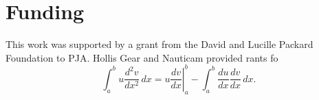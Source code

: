 \section{Funding}
\label{funding} 
This work was supported by a grant from the David and Lucille Packard Foundation to PJA. Hollis Gear and Nauticam provided rants fo
\begin{equation}
\label{eqn:drag}
	\int_a^bu\frac{d^2v}{dx^2}\,dx
	=\left.u\frac{dv}{dx}\right|_a^b
	-\int_a^b\frac{du}{dx}\frac{dv}{dx}\,dx.
\end{equation}
